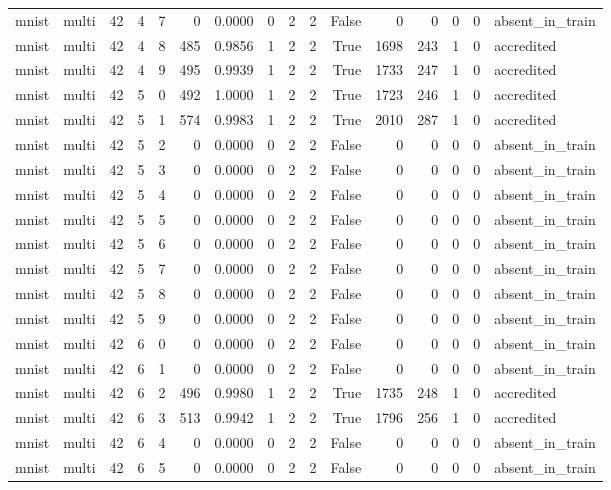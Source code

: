 \begin{tabular}{llrrrrrrrrrrrrrl}
mnist & multi & 42 & 4 & 7 & 0 & 0.0000 & 0 & 2 & 2 & False & 0 & 0 & 0 & 0 & absent\_in\_train \\
mnist & multi & 42 & 4 & 8 & 485 & 0.9856 & 1 & 2 & 2 & True & 1698 & 243 & 1 & 0 & accredited \\
mnist & multi & 42 & 4 & 9 & 495 & 0.9939 & 1 & 2 & 2 & True & 1733 & 247 & 1 & 0 & accredited \\
mnist & multi & 42 & 5 & 0 & 492 & 1.0000 & 1 & 2 & 2 & True & 1723 & 246 & 1 & 0 & accredited \\
mnist & multi & 42 & 5 & 1 & 574 & 0.9983 & 1 & 2 & 2 & True & 2010 & 287 & 1 & 0 & accredited \\
mnist & multi & 42 & 5 & 2 & 0 & 0.0000 & 0 & 2 & 2 & False & 0 & 0 & 0 & 0 & absent\_in\_train \\
mnist & multi & 42 & 5 & 3 & 0 & 0.0000 & 0 & 2 & 2 & False & 0 & 0 & 0 & 0 & absent\_in\_train \\
mnist & multi & 42 & 5 & 4 & 0 & 0.0000 & 0 & 2 & 2 & False & 0 & 0 & 0 & 0 & absent\_in\_train \\
mnist & multi & 42 & 5 & 5 & 0 & 0.0000 & 0 & 2 & 2 & False & 0 & 0 & 0 & 0 & absent\_in\_train \\
mnist & multi & 42 & 5 & 6 & 0 & 0.0000 & 0 & 2 & 2 & False & 0 & 0 & 0 & 0 & absent\_in\_train \\
mnist & multi & 42 & 5 & 7 & 0 & 0.0000 & 0 & 2 & 2 & False & 0 & 0 & 0 & 0 & absent\_in\_train \\
mnist & multi & 42 & 5 & 8 & 0 & 0.0000 & 0 & 2 & 2 & False & 0 & 0 & 0 & 0 & absent\_in\_train \\
mnist & multi & 42 & 5 & 9 & 0 & 0.0000 & 0 & 2 & 2 & False & 0 & 0 & 0 & 0 & absent\_in\_train \\
mnist & multi & 42 & 6 & 0 & 0 & 0.0000 & 0 & 2 & 2 & False & 0 & 0 & 0 & 0 & absent\_in\_train \\
mnist & multi & 42 & 6 & 1 & 0 & 0.0000 & 0 & 2 & 2 & False & 0 & 0 & 0 & 0 & absent\_in\_train \\
mnist & multi & 42 & 6 & 2 & 496 & 0.9980 & 1 & 2 & 2 & True & 1735 & 248 & 1 & 0 & accredited \\
mnist & multi & 42 & 6 & 3 & 513 & 0.9942 & 1 & 2 & 2 & True & 1796 & 256 & 1 & 0 & accredited \\
mnist & multi & 42 & 6 & 4 & 0 & 0.0000 & 0 & 2 & 2 & False & 0 & 0 & 0 & 0 & absent\_in\_train \\
mnist & multi & 42 & 6 & 5 & 0 & 0.0000 & 0 & 2 & 2 & False & 0 & 0 & 0 & 0 & absent\_in\_train \\

\end{tabular}
